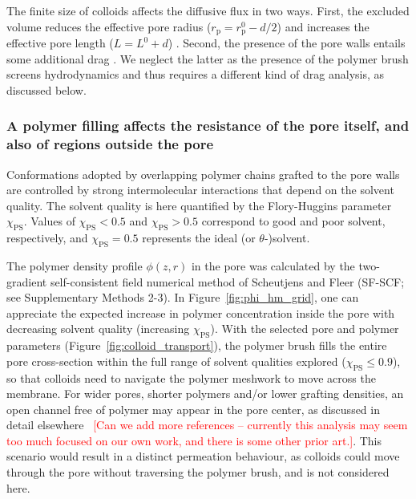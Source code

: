 \documentclass[12pt, a4paper]{article}
\newcommand\todo[1]{\textcolor{red}{#1}}
\begin{document}
The finite size of colloids affects the diffusive flux in two ways.
First, the excluded volume reduces the effective pore radius ($r_{\text{p}} = r_{\text{p}}^0 - d/2$) and increases the effective pore length ($L = L^0 + d$) \cite{Renkin1954, Beck1970, Bungay1973, Anderson1974, Brenner1977}.
Second, the presence of the pore walls entails some additional drag \cite{Ladenburg1907, Faxen1922, Haberman1958}.
We neglect the latter as the presence of the polymer brush screens hydrodynamics and thus requires a different kind of drag analysis, as discussed below.


\subsubsection{A polymer filling affects the resistance of the pore itself, and also of regions outside the pore}

Conformations adopted by overlapping polymer chains grafted to the pore walls are controlled by strong intermolecular interactions that depend on the solvent quality.
The solvent quality is here quantified by the Flory-Huggins parameter $\chi_{\text{PS}}$.
Values of $\chi_{\text{PS}}<0.5$ and $\chi_{\text{PS}}>0.5$ correspond to good and poor solvent, respectively, and $\chi_{\text{PS}}=0.5$ represents the ideal (or $\theta$-)solvent.

The polymer density profile $\phi(z,r)$ in the pore was calculated by the two-gradient self-consistent field numerical method of Scheutjens and Fleer (SF-SCF; see Supplementary Methods 2-3).
In Figure~\ref{fig:phi_hm_grid}, one can appreciate the expected increase in polymer concentration inside the pore with decreasing solvent quality (increasing $\chi_{\text{PS}}$).
With the selected pore and polymer parameters (Figure~\ref{fig:colloid_transport}), the polymer brush fills the entire pore cross-section within the full range of solvent qualities explored ($\chi_{\text{PS}}\le0.9$), so that colloids need to navigate the polymer meshwork to move across the membrane.
For wider pores, shorter polymers and/or lower grafting densities, an open channel free of polymer may appear in the pore center, as discussed in detail elsewhere~\cite{Laktionov2021}
\todo{[Can we add more references -- currently this analysis may seem too much focused on our own work, and there is some other prior art.]}.
This scenario would result in a distinct permeation behaviour, as colloids could move through the pore without traversing the polymer brush, and is not considered here.
\end{document}
